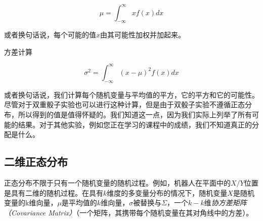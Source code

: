 \begin{equation}
\mu=\int_{-\infty}^{\infty}xf(x)dx
\end{equation}



或者换句话说，每个可能的值$x$由其可能性加权并加起来。

方差计算

\begin{equation}
\sigma^2=\int_{-\infty}^{\infty}(x-\mu)^2f(x)dx
\end{equation}


或者换句话说，我们计算每个随机变量与平均值的平方，它的平方和它的可能性。尽管对于双重骰子实验也可以进行这种计算，但是由于双骰子实验不遵循正态分布，所以得到的值是值得怀疑的。我们知道这一点，因为我们实际上列举了所有可能的结果。对于其他实验，例如您正在学习的课程中的成绩，我们不知道真正的分配是什么。


\subsection{二维正态分布}
正态分布不限于只有一个随机变量的随机过程。例如，机器人在平面中的$X/Y$位置是具有二维的随机过程。在具有$k$维度的多变量分布的情况下，随机变量$X$是随机变量的k维向量，$\mu$是平均值的$k$维向量，$\sigma$被替换与$\Sigma$，一个$k-k$维\emph{协方差矩阵（Covariance Matrix）}（一个矩阵，其携带每个随机变量在其对角线中的方差）。

